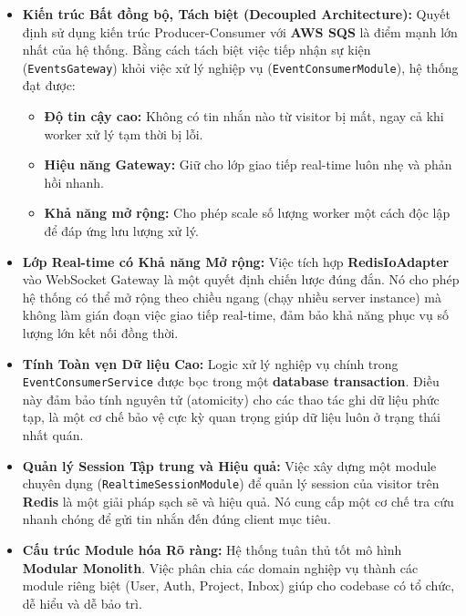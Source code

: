 \begin{itemize}
    \item \textbf{Kiến trúc Bất đồng bộ, Tách biệt (Decoupled Architecture):}
    Quyết định sử dụng kiến trúc Producer-Consumer với \textbf{AWS SQS} là điểm mạnh lớn nhất của hệ thống. Bằng cách tách biệt việc tiếp nhận sự kiện (\texttt{EventsGateway}) khỏi việc xử lý nghiệp vụ (\texttt{EventConsumerModule}), hệ thống đạt được:
    \begin{itemize}
        \item \textbf{Độ tin cậy cao:} Không có tin nhắn nào từ visitor bị mất, ngay cả khi worker xử lý tạm thời bị lỗi.
        \item \textbf{Hiệu năng Gateway:} Giữ cho lớp giao tiếp real-time luôn nhẹ và phản hồi nhanh.
        \item \textbf{Khả năng mở rộng:} Cho phép scale số lượng worker một cách độc lập để đáp ứng lưu lượng xử lý.
    \end{itemize}

    \item \textbf{Lớp Real-time có Khả năng Mở rộng:}
    Việc tích hợp \textbf{RedisIoAdapter} vào WebSocket Gateway là một quyết định chiến lược đúng đắn. Nó cho phép hệ thống có thể mở rộng theo chiều ngang (chạy nhiều server instance) mà không làm gián đoạn việc giao tiếp real-time, đảm bảo khả năng phục vụ số lượng lớn kết nối đồng thời.

    \item \textbf{Tính Toàn vẹn Dữ liệu Cao:}
    Logic xử lý nghiệp vụ chính trong \texttt{EventConsumerService} được bọc trong một \textbf{database transaction}. Điều này đảm bảo tính nguyên tử (atomicity) cho các thao tác ghi dữ liệu phức tạp, là một cơ chế bảo vệ cực kỳ quan trọng giúp dữ liệu luôn ở trạng thái nhất quán.

    \item \textbf{Quản lý Session Tập trung và Hiệu quả:}
    Việc xây dựng một module chuyên dụng (\texttt{RealtimeSessionModule}) để quản lý session của visitor trên \textbf{Redis} là một giải pháp sạch sẽ và hiệu quả. Nó cung cấp một cơ chế tra cứu nhanh chóng để gửi tin nhắn đến đúng client mục tiêu.

    \item \textbf{Cấu trúc Module hóa Rõ ràng:}
    Hệ thống tuân thủ tốt mô hình \textbf{Modular Monolith}. Việc phân chia các domain nghiệp vụ thành các module riêng biệt (User, Auth, Project, Inbox) giúp cho codebase có tổ chức, dễ hiểu và dễ bảo trì.
\end{itemize}


